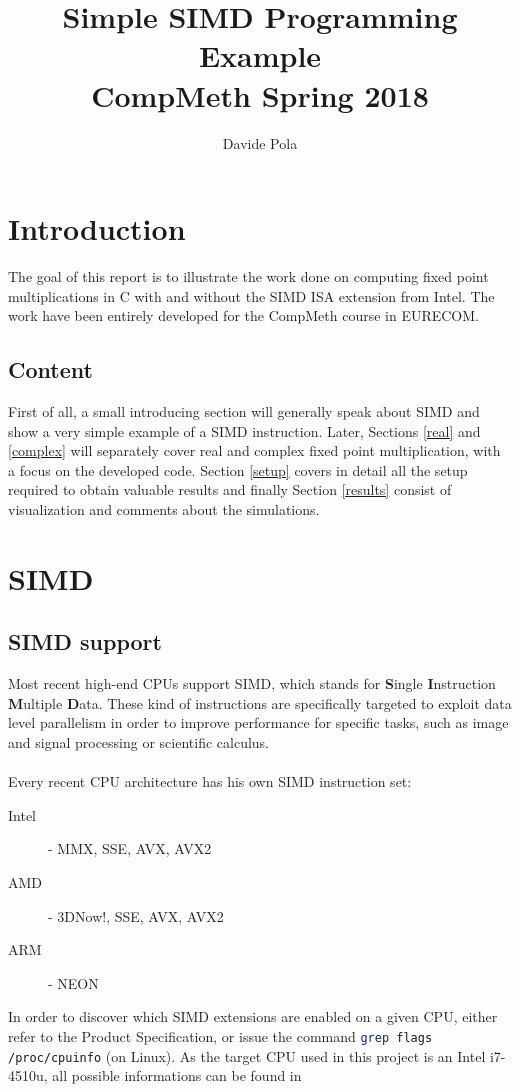 \documentclass[a4paper]{article}
\title{\textbf{Simple SIMD Programming Example}\\CompMeth Spring 2018}
\author{Davide Pola}
\begin{document}
\maketitle

\tableofcontents

\section{Introduction}

The goal of this report is to illustrate the work done on computing fixed point multiplications in C with and without the SIMD ISA extension from Intel. The work have been entirely developed for the CompMeth course in EURECOM.

\subsection{Content}
First of all, a small introducing section will generally speak about SIMD and show a very simple example of a SIMD instruction.
Later, Sections \ref{real} and \ref{complex} will separately cover real and complex fixed point multiplication, with a focus on the developed code.
Section \ref{setup} covers in detail all the setup required to obtain valuable results and finally Section \ref{results} consist of visualization and comments about the simulations.

\section{SIMD}\label{intro}
\subsection{SIMD support}
Most recent high-end CPUs support SIMD, which stands for \textbf{S}ingle \textbf{I}nstruction \textbf{M}ultiple \textbf{D}ata. These kind of instructions are specifically targeted to exploit data level parallelism in order to improve performance for specific tasks, such as image and signal processing or scientific calculus.
\\\\Every recent CPU architecture has his own SIMD instruction set: 
\begin{description}
	\item[Intel] - MMX, SSE, AVX, AVX2
	\item[AMD] - 3DNow!, SSE, AVX, AVX2
	\item[ARM] - NEON
\end{description}
In order to discover which SIMD extensions are enabled on a given CPU, either refer to the Product Specification, or issue the command \lstinline[language=bash, basicstyle=\ttfamily]{grep flags /proc/cpuinfo} (on Linux).
As the target CPU used in this project is an Intel i7-4510u, all possible informations can be found in \autocite{4510u}
\end{document}
